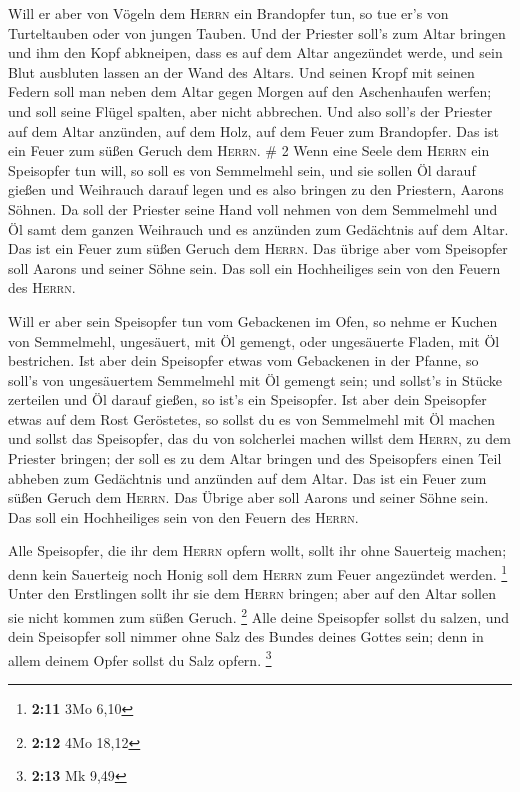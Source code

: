  Will er aber von Vögeln dem \textsc{Herrn} ein
Brandopfer tun, so tue er's von Turteltauben oder von jungen Tauben.
 Und der Priester soll's zum Altar bringen und ihm den
Kopf abkneipen, dass es auf dem Altar angezündet werde, und sein Blut
ausbluten lassen an der Wand des Altars.  Und seinen
Kropf mit seinen Federn soll man neben dem Altar gegen Morgen auf den
Aschenhaufen werfen;  und soll seine Flügel spalten, aber
nicht abbrechen. Und also soll's der Priester auf dem Altar anzünden,
auf dem Holz, auf dem Feuer zum Brandopfer. Das ist ein Feuer zum süßen
Geruch dem \textsc{Herrn}. \# 2  Wenn eine Seele dem
\textsc{Herrn} ein Speisopfer tun will, so soll es von Semmelmehl sein,
und sie sollen Öl darauf gießen und Weihrauch darauf legen
 und es also bringen zu den Priestern, Aarons Söhnen. Da
soll der Priester seine Hand voll nehmen von dem Semmelmehl und Öl samt
dem ganzen Weihrauch und es anzünden zum Gedächtnis auf dem Altar. Das
ist ein Feuer zum süßen Geruch dem \textsc{Herrn}.  Das
übrige aber vom Speisopfer soll Aarons und seiner Söhne sein. Das soll
ein Hochheiliges sein von den Feuern des \textsc{Herrn}.

 Will er aber sein Speisopfer tun vom Gebackenen im Ofen,
so nehme er Kuchen von Semmelmehl, ungesäuert, mit Öl gemengt, oder
ungesäuerte Fladen, mit Öl bestrichen.  Ist aber dein
Speisopfer etwas vom Gebackenen in der Pfanne, so soll's von
ungesäuertem Semmelmehl mit Öl gemengt sein;  und sollst's
in Stücke zerteilen und Öl darauf gießen, so ist's ein Speisopfer.
 Ist aber dein Speisopfer etwas auf dem Rost Geröstetes,
so sollst du es von Semmelmehl mit Öl machen  und sollst
das Speisopfer, das du von solcherlei machen willst dem \textsc{Herrn},
zu dem Priester bringen; der soll es zu dem Altar bringen 
und des Speisopfers einen Teil abheben zum Gedächtnis und anzünden auf
dem Altar. Das ist ein Feuer zum süßen Geruch dem \textsc{Herrn}.
 Das Übrige aber soll Aarons und seiner Söhne sein. Das
soll ein Hochheiliges sein von den Feuern des \textsc{Herrn}.

 Alle Speisopfer, die ihr dem \textsc{Herrn} opfern
wollt, sollt ihr ohne Sauerteig machen; denn kein Sauerteig noch Honig
soll dem \textsc{Herrn} zum Feuer angezündet werden. \footnote{\textbf{2:11}
  3Mo 6,10}  Unter den Erstlingen sollt ihr sie dem
\textsc{Herrn} bringen; aber auf den Altar sollen sie nicht kommen zum
süßen Geruch. \footnote{\textbf{2:12} 4Mo 18,12}  Alle
deine Speisopfer sollst du salzen, und dein Speisopfer soll nimmer ohne
Salz des Bundes deines Gottes sein; denn in allem deinem Opfer sollst du
Salz opfern. \footnote{\textbf{2:13} Mk 9,49}

